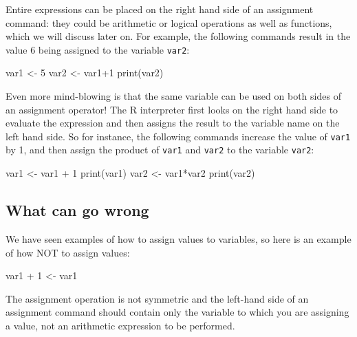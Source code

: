 \documentclass[
  letterpaper,
  DIV=11,
  numbers=noendperiod]{scrreprt}
\newenvironment{Shaded}{\begin{snugshade}}{\end{snugshade}}
\newcommand{\NormalTok}[1]{\textcolor[rgb]{0.00,0.23,0.31}{#1}}
\begin{document}
Entire expressions can be placed on the right hand side of an assignment
command: they could be arithmetic or logical operations as well as
functions, which we will discuss later on. For example, the following
commands result in the value 6 being assigned to the variable
\texttt{var2}:

\begin{Shaded}
\begin{Highlighting}[]
\NormalTok{var1 \textless{}{-} 5}
\NormalTok{var2 \textless{}{-} var1+1}
\NormalTok{print(var2)}
\end{Highlighting}
\end{Shaded}

Even more mind-blowing is that the same variable can be used on both
sides of an assignment operator! The R interpreter first looks on the
right hand side to evaluate the expression and then assigns the result
to the variable name on the left hand side. So for instance, the
following commands increase the value of \texttt{var1} by 1, and then
assign the product of \texttt{var1} and \texttt{var2} to the variable
\texttt{var2}:

\begin{Shaded}
\begin{Highlighting}[]
\NormalTok{var1 \textless{}{-} var1 + 1}
\NormalTok{print(var1)}
\NormalTok{var2 \textless{}{-} var1*var2}
\NormalTok{print(var2)}
\end{Highlighting}
\end{Shaded}

\hypertarget{what-can-go-wrong-1}{%
\subsection*{What can go wrong}\label{what-can-go-wrong-1}}

We have seen examples of how to assign values to variables, so here is
an example of how NOT to assign values:

\begin{Shaded}
\begin{Highlighting}[]
\NormalTok{var1 + 1 \textless{}{-} var1}
\end{Highlighting}
\end{Shaded}

The assignment operation is not symmetric and the left-hand side of an
assignment command should contain only the variable to which you are
assigning a value, not an arithmetic expression to be performed.
\end{document}
